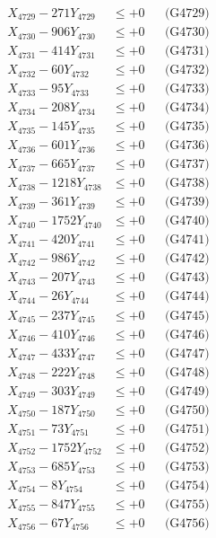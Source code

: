 \documentclass[a4paper,10pt]{article}
\begin{document}
{\begin{align}
X_{4729} - 271Y_{4729} &\leq +0 && \text{(G4729)} \\
X_{4730} - 906Y_{4730} &\leq +0 && \text{(G4730)} \\
\allowbreak
X_{4731} - 414Y_{4731} &\leq +0 && \text{(G4731)} \\
X_{4732} - 60Y_{4732} &\leq +0 && \text{(G4732)} \\
X_{4733} - 95Y_{4733} &\leq +0 && \text{(G4733)} \\
X_{4734} - 208Y_{4734} &\leq +0 && \text{(G4734)} \\
X_{4735} - 145Y_{4735} &\leq +0 && \text{(G4735)} \\
X_{4736} - 601Y_{4736} &\leq +0 && \text{(G4736)} \\
X_{4737} - 665Y_{4737} &\leq +0 && \text{(G4737)} \\
X_{4738} - 1218Y_{4738} &\leq +0 && \text{(G4738)} \\
X_{4739} - 361Y_{4739} &\leq +0 && \text{(G4739)} \\
X_{4740} - 1752Y_{4740} &\leq +0 && \text{(G4740)} \\
\allowbreak
X_{4741} - 420Y_{4741} &\leq +0 && \text{(G4741)} \\
X_{4742} - 986Y_{4742} &\leq +0 && \text{(G4742)} \\
X_{4743} - 207Y_{4743} &\leq +0 && \text{(G4743)} \\
X_{4744} - 26Y_{4744} &\leq +0 && \text{(G4744)} \\
X_{4745} - 237Y_{4745} &\leq +0 && \text{(G4745)} \\
X_{4746} - 410Y_{4746} &\leq +0 && \text{(G4746)} \\
X_{4747} - 433Y_{4747} &\leq +0 && \text{(G4747)} \\
X_{4748} - 222Y_{4748} &\leq +0 && \text{(G4748)} \\
X_{4749} - 303Y_{4749} &\leq +0 && \text{(G4749)} \\
X_{4750} - 187Y_{4750} &\leq +0 && \text{(G4750)} \\
\allowbreak
X_{4751} - 73Y_{4751} &\leq +0 && \text{(G4751)} \\
X_{4752} - 1752Y_{4752} &\leq +0 && \text{(G4752)} \\
X_{4753} - 685Y_{4753} &\leq +0 && \text{(G4753)} \\
X_{4754} - 8Y_{4754} &\leq +0 && \text{(G4754)} \\
X_{4755} - 847Y_{4755} &\leq +0 && \text{(G4755)} \\
X_{4756} - 67Y_{4756} &\leq +0 && \text{(G4756)} \\

\end{align}}
\end{document}
